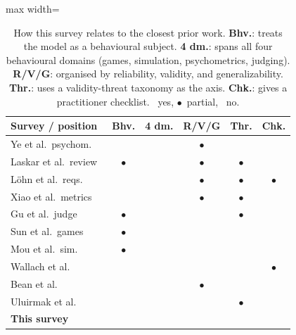 \documentclass[11pt]{article}
\newcommand{\cmark}{\textcolor{tierC}{\ding{51}}}
\newcommand{\xmark}{\textcolor{black!30}{\ding{55}}}
\newcommand{\pmark}{\textcolor{tierB}{$\bullet$}}
\begin{document}
\begin{table}[H]
\centering
\scriptsize
\setlength{\tabcolsep}{2.5pt}
\renewcommand{\arraystretch}{1.12}
\begin{adjustbox}{max width=\columnwidth}
\begin{tabular}{@{}lccccc@{}}
\toprule
\textbf{Survey / position} & \textbf{Bhv.} & \textbf{4 dm.} & \textbf{R/V/G} & \textbf{Thr.} & \textbf{Chk.} \\
\midrule
Ye et al.\ psychom.\ \citeyearpar{ye2025psychometrics}     & \cmark & \xmark & \pmark & \xmark & \xmark \\
Laskar et al.\ review\ \citeyearpar{laskar2024systematic} & \pmark & \xmark & \pmark & \pmark & \xmark \\
L\"ohn et al.\ reqs.\ \citeyearpar{lohn2024requirements}  & \xmark & \xmark & \pmark & \pmark & \pmark \\
Xiao et al.\ metrics\ \citeyearpar{xiao2023metriceval}    & \xmark & \xmark & \pmark & \pmark & \xmark \\
Gu et al.\ judge \citeyearpar{gu2024judge}                 & \pmark & \xmark & \xmark & \pmark & \xmark \\
Sun et al.\ games \citeyearpar{sun2025gametheory}          & \pmark & \xmark & \xmark & \xmark & \xmark \\
Mou et al.\ sim.\ \citeyearpar{mou2024individual}          & \pmark & \xmark & \xmark & \xmark & \xmark \\
Wallach et al.\ \citeyearpar{wallach2025position}          & \cmark & \xmark & \cmark & \xmark & \pmark \\
Bean et al.\ \citeyearpar{bean2025measuring}               & \xmark & \xmark & \pmark & \xmark & \cmark \\
Uluirmak et al.\ \citeyearpar{uluirmak2026evalsafetygap}   & \xmark & \xmark & \xmark & \pmark & \xmark \\
\midrule
\textbf{This survey} & \cmark & \cmark & \cmark & \cmark & \cmark \\
\bottomrule
\end{tabular}
\end{adjustbox}
\caption{How this survey relates to the closest prior work. \textbf{Bhv.}: treats
the model as a behavioural subject. \textbf{4 dm.}: spans all four behavioural
domains (games, simulation, psychometrics, judging). \textbf{R/V/G}: organised
by reliability, validity, and generalizability. \textbf{Thr.}: uses a
validity-threat taxonomy as the axis. \textbf{Chk.}: gives a practitioner
checklist. \cmark~yes, \pmark~partial, \xmark~no.}
\label{tab:surveycmp}
\end{table}
\end{document}

